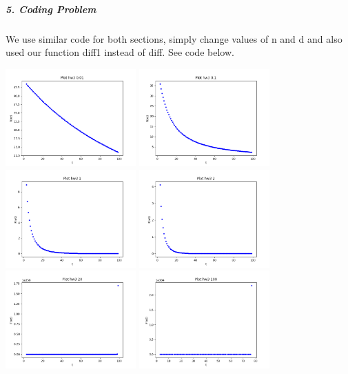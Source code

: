 \documentclass[12pt]{article}
\begin{document}
    \subparagraph{5. Coding Problem}
    We use similar code for both sections, simply change values of n and d and also used 
    our function diff1 instead of diff. See code below.

    \begin{center}
    \includegraphics[width=5cm]{part 5/Figure_1.png}
    \includegraphics[width=5cm]{part 5/Figure_2.png}
    \includegraphics[width=5cm]{part 5/Figure_3.png}
    \includegraphics[width=5cm]{part 5/Figure_4.png}
    \includegraphics[width=5cm]{part 5/Figure_5.png}
    \includegraphics[width=5cm]{part 5/Figure_6.png}
    \end{center}

    \inputminted{python}{Szemis_hw3.py}
\end{document}
